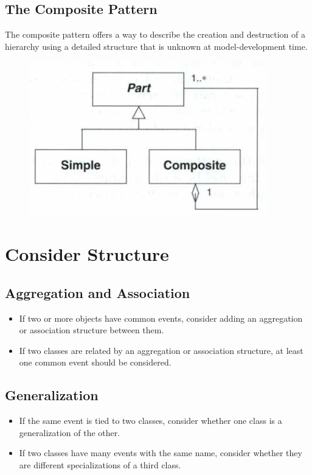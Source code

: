 \subsection*{The Composite Pattern \ooad[107]}
The composite pattern offers a way to describe the creation and destruction of a hierarchy using a detailed structure that is unknown at model-development time. 
\begin{figure}[H]
    \centering
    \includegraphics[width=\linewidth/2]{parts/2_problem_domain_analysis/behavior/figures/composite_pattern.png}
\end{figure}

\section{Consider Structure}
\subsection*{Aggregation and Association\ooad[108]}
\begin{itemize}
    \item If two or more objects have common events, consider adding an aggregation or association structure between them.
    \item If two classes are related by an aggregation or association structure, at least one common event should be considered.
\end{itemize}

\subsection*{Generalization \ooad[109]}
\begin{itemize}
    \item If the same event is tied to two classes, consider whether one class is a generalization of the other.
    \item If two classes have many events with the same name, consider whether they are different specializations of a third class.
\end{itemize}